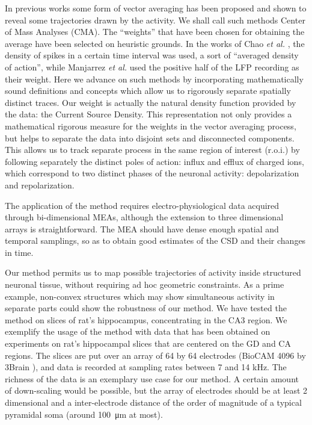 \documentclass[11pt, letterpaper]{article}
\newcommand{\mum}[1]{\SI{#1}{\micro\metre}}
\begin{document}
In previous works some form of vector averaging has been proposed and shown to reveal some trajectories drawn by the activity. We shall call such methods Center of Mass Analyses (CMA).  The ``weights'' that have been chosen for obtaining the average have been selected on heuristic grounds. In the works of Chao \emph{et al.} \cite{Chao05, Chao07}, the density of spikes in a certain time interval was used, a sort of ``averaged density of action'', while Manjarrez \emph{et al.} \cite{Manjarrez07, Manjarrez09} used the positive half of the LFP recording as their weight. 
Here we advance on such methods by incorporating mathematically sound definitions and concepts which allow us to rigorously separate spatially distinct traces. Our weight is actually the natural density function provided by the data: the Current Source Density. This representation not only provides a mathematical rigorous  measure for the weights in the vector averaging process, but helps to separate the data into disjoint sets and disconnected components.
This allows us to track separate process in the same region of interest
(r.o.i.) by following separately the distinct poles of action: influx and
efflux of charged ions, which correspond to two distinct phases of the
neuronal activity: depolarization and repolarization. 

The application of the method requires electro-physiological data acquired
through bi-dimensional MEAs, although the extension to three dimensional arrays
is straightforward.
The MEA should have dense enough spatial and temporal samplings,
so as to obtain good estimates of the CSD and their changes in time.

Our method permits us to map possible trajectories of activity inside structured neuronal tissue, without requiring ad hoc geometric constraints. As a prime example, non-convex structures which may show simultaneous activity in separate parts could show the robustness of our method. We have tested the method on slices of rat's hippocampus, concentrating in the CA3 region. We exemplify the usage of the method with data that has been obtained on experiments on rat's hippocampal slices that are centered on the GD and CA
regions. The slices are put over an array of 64 by 64 electrodes
(BioCAM 4096 by 3Brain \cite{BioCam}),
and data is recorded at sampling rates between 7 and 14 kHz. The richness of the
data is an exemplary use case for our method. A certain amount of down-scaling would be 
possible, but the array of electrodes should be at least 2 dimensional and
a inter-electrode distance of the order of magnitude of a typical pyramidal soma
(around \mum{100} at most). 
\end{document}
